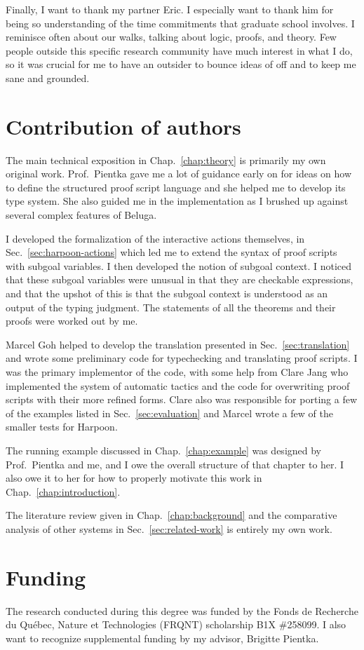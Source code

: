 Finally, I want to thank my partner Eric. I especially want to thank him for
being so understanding of the time commitments that graduate school involves. I
reminisce often about our walks, talking about logic, proofs, and theory. Few
people outside this specific research community have much interest in what I do,
so it was crucial for me to have an outsider to bounce ideas of off and to keep
me sane and grounded.

\section*{Contribution of authors}

The main technical exposition in Chap.~\ref{chap:theory} is primarily my own
original work. Prof.~Pientka gave me a lot of guidance early on for ideas on how
to define the structured proof script language and she helped me to develop its
type system. She also guided me in the implementation as I brushed up against
several complex features of Beluga.

I developed the formalization of the interactive actions themselves, in
Sec.~\ref{sec:harpoon-actions} which led me to extend the syntax of proof
scripts with subgoal variables. I then developed the notion of subgoal context.
I noticed that these subgoal variables were unusual in that they are checkable
expressions, and that the upshot of this is that the subgoal context is
understood as an output of the typing judgment.
The statements of all the theorems and their proofs were worked out by me.

Marcel Goh helped to develop the translation presented in
Sec.~\ref{sec:translation} and wrote some preliminary code for typechecking and
translating proof scripts. I was the primary implementor of the code, with some
help from Clare Jang who implemented the system of automatic tactics and the
code for overwriting proof scripts with their more refined forms.
Clare also was responsible for porting a few of the examples listed in
Sec.~\ref{sec:evaluation} and Marcel wrote a few of the smaller tests for
Harpoon.

The running example discussed in Chap.~\ref{chap:example} was designed by
Prof.~Pientka and me, and I owe the overall structure of that chapter to her.
I also owe it to her for how to properly motivate this work in
Chap.~\ref{chap:introduction}.

The literature review given in Chap.~\ref{chap:background}
and the comparative analysis of other systems in Sec.~\ref{sec:related-work} is
entirely my own work.

\section*{Funding}

The research conducted during this degree was funded by the Fonds de Recherche
du Qu\'ebec, Nature et Technologies (FRQNT) scholarship B1X \#258099.
I also want to recognize supplemental funding by my advisor, Brigitte Pientka.

